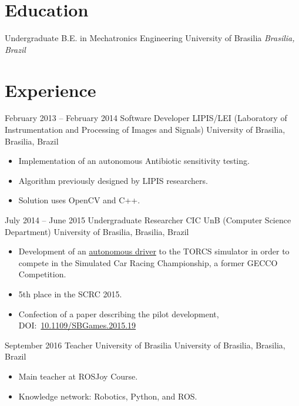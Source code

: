 \documentclass[a4paper, 10pt]{moderncv}        %
\begin{document}
\makecvtitle
\section{Education}
\cventry
{Undergraduate}
{B.E. in Mechatronics Engineering}
{University of Brasilia}
{}
{\textit{Brasilia, Brazil}}
{}
\section{Experience}
\cventry
{February 2013 -- February 2014}
{Software Developer}
{LIPIS/LEI (Laboratory of Instrumentation and Processing of Images and Signals)}
{University of Brasilia, Brasilia, Brazil}
{}
{\begin{itemize}%
    \item Implementation of an autonomous Antibiotic sensitivity testing.
    \item Algorithm previously designed by LIPIS researchers.
    \item Solution uses OpenCV and C++.
    \end{itemize}}
\cventry
{July 2014 -- June 2015}
{Undergraduate Researcher}
{CIC UnB (Computer Science Department)}
{University of Brasilia, Brasilia, Brazil}
{}
{\begin{itemize}%
    \item Development of an \href{https://github.com/bruno147/driver-ga}{autonomous driver} to the TORCS simulator in order to compete in the Simulated Car Racing Championship, a former GECCO Competition.
    \item 5th place in the SCRC 2015.
    \item Confection of a paper describing the pilot development, DOI:~\href{https://doi.org/10.1109/SBGames.2015.19}{10.1109/SBGames.2015.19}
    \end{itemize}}
\cventry
{September 2016}
{Teacher}
{University of Brasilia}
{University of Brasilia, Brasilia, Brazil}
{}
{\begin{itemize}%
    \item Main teacher at ROSJoy Course.
    \item Knowledge network: Robotics, Python, and ROS.
    \end{itemize}}
\end{document}

